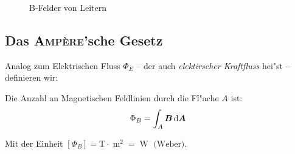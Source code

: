 \begin{figure}
   \caption{B-Felder von Leitern}
   \label{abb_bfelder_leiter}
\end{figure}





\subsection{Das \textsc{Amp\`ere}'sche Gesetz}
\label{kap_ampersche-gesetz}

Analog zum Elektrischen Fluss $\Phi_E$ -- der auch
\emph{elektirscher Kraftfluss} hei"st -- definieren wir:
\begin{Def}
    Die Anzahl an
   Magnetischen Feldlinien durch die Fl"ache $A$ ist:
   \begin{equation}
      \label{eqn_def_magn_kraftfluss}
      \Phi_B = \int_A \boldsymbol{B} \, \mathrm{d} \boldsymbol{A}
   \end{equation}
\end{Def}
Mit der Einheit $[\Phi_B] = \text{T} \cdot \operatorname{m}^2 =
\operatorname{W} \text{ (Weber)}$.

